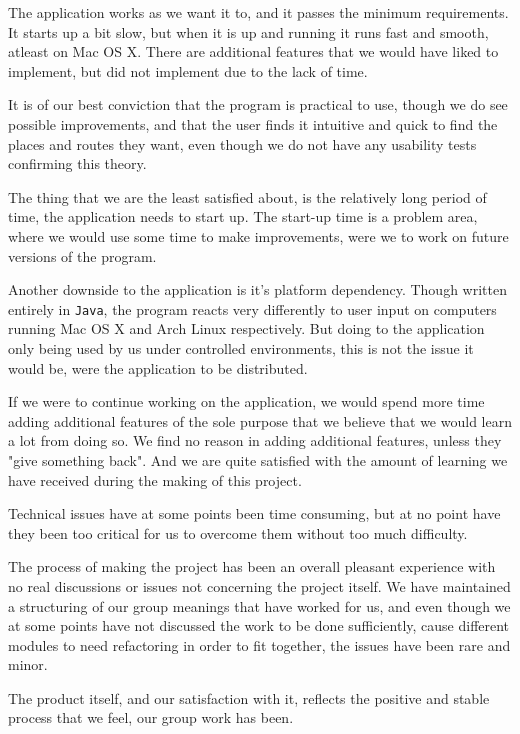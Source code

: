 The application works as we want it to, and it passes the minimum requirements. It starts up a bit slow, but when it is up and running it runs fast and smooth, atleast on Mac OS X. There are additional features that we would have liked to implement, but did not implement due to the lack of time.

It is of our best conviction that the program is practical to use, though we do see possible improvements, and that the user finds it intuitive and quick to find the places and routes they want, even though we do not have any usability tests confirming this theory.

The thing that we are the least satisfied about, is the relatively long period of time, the application needs to start up. The start-up time is a problem area, where we would use some time to make improvements, were we to work on future versions of the program.

Another downside to the application is it's platform dependency. Though written entirely in \texttt{Java}, the program reacts very differently to user input on computers running Mac OS X and Arch Linux respectively. But doing to the application only being used by us under controlled environments, this is not the issue it would be, were the application to be distributed.

If we were to continue working on the application, we would spend more time adding additional features of the sole purpose that we believe that we would learn a lot from doing so. We find no reason in adding additional features, unless they "give something back". And we are quite satisfied with the amount of learning we have received during the making of this project.

Technical issues have at some points been time consuming, but at no point have they been too critical for us to overcome them without too much difficulty.

The process of making the project has been an overall pleasant experience with no real discussions or issues not concerning the project itself. We have maintained a structuring of our group meanings that have worked for us, and even though we at some points have not discussed the work to be done sufficiently, cause different modules to need refactoring in order to fit together, the issues have been rare and minor.

The product itself, and our satisfaction with it, reflects the positive and stable process that we feel, our group work has been.
